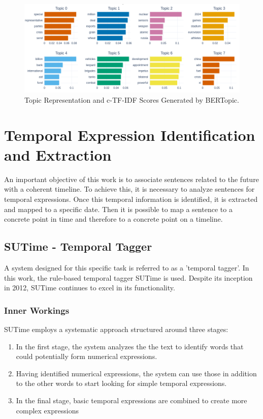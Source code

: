 \documentclass[a4paper,10pt]{report}
\begin{document}
\begin{figure}
  \centering
  \includegraphics[width=15cm]{img/topic_representation.png}
  \caption{Topic Representation and c-TF-IDF Scores Generated by BERTopic.}
  \label{fig:topic_representation}
\end{figure}


\chapter{Temporal Expression Identification and Extraction}
An important objective of this work is to associate sentences related to the future with a coherent timeline. To achieve this, it is necessary to analyze sentences for temporal expressions. Once this temporal information is identified, it is extracted and mapped to a specific date. Then it is possible to map a sentence to a concrete point in time and therefore to a concrete point on a timeline.

\section{SUTime - Temporal Tagger}
A system designed for this specific task is referred to as a 'temporal tagger'. In this work, the rule-based temporal tagger SUTime \cite{sutime} is used. Despite its inception in 2012, SUTime continues to excel in its functionality.

\subsection{Inner Workings}
SUTime employs a systematic approach structured around three stages:

\begin{enumerate}
  \item In the first stage, the system analyzes the the text to identify words that could potentially form numerical expressions.

  \item Having identified numerical expressions, the system can use those in addition to the other words to start looking for simple temporal expressions.

  \item In the final stage, basic temporal expressions are combined to create more complex expressions
\end{enumerate}
\end{document}

